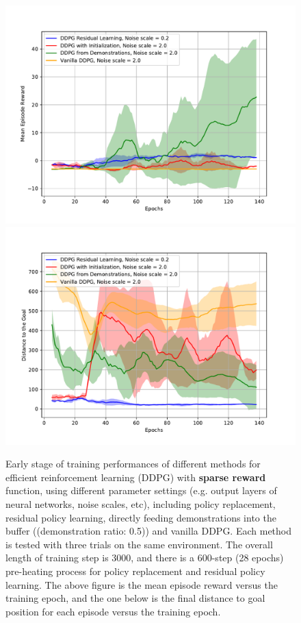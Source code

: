 \documentclass{article}
\begin{document}
\begin{figure}[H]
	\centering
	\includegraphics[scale=0.5]{img/3000step_sparse1.pdf}
	\includegraphics[scale=0.5]{img/3000step_sparse2.pdf}
	\caption{Early stage of training performances of different methods for efficient reinforcement learning (DDPG) with \textbf{sparse reward} function, using different parameter settings (e.g. output layers of neural networks, noise scales, etc), including policy replacement, residual policy learning, directly feeding demonstrations into the buffer ((demonstration ratio: 0.5)) and vanilla DDPG. Each method is tested with three trials on the same environment. The overall length of training step is 3000, and there is a 600-step (28 epochs) pre-heating process for policy replacement and residual policy learning. The above figure is the mean episode reward versus the training epoch, and the one below is the final distance to goal position for each episode versus the training epoch. }
	\label{fig:comparion5}
\end{figure}
\end{document}
